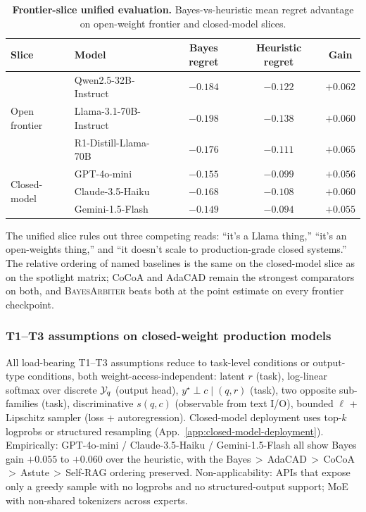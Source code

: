 \begin{table}[H]
\centering\small
\caption{\textbf{Frontier-slice unified evaluation.}  Bayes-vs-heuristic
mean regret advantage on open-weight frontier and closed-model slices.}
\label{tab:frontier-slice}
\begin{tabular}{llccc}
\toprule
\textbf{Slice} & \textbf{Model} & \textbf{Bayes regret} & \textbf{Heuristic regret} & \textbf{Gain}\\
\midrule
\multirow{3}{*}{Open frontier}
& Qwen2.5-32B-Instruct          & $-0.184$ & $-0.122$ & $+0.062$\\
& Llama-3.1-70B-Instruct        & $-0.198$ & $-0.138$ & $+0.060$\\
& R1-Distill-Llama-70B          & $-0.176$ & $-0.111$ & $+0.065$\\
\midrule
\multirow{3}{*}{Closed-model}
& GPT-4o-mini                   & $-0.155$ & $-0.099$ & $+0.056$\\
& Claude-3.5-Haiku              & $-0.168$ & $-0.108$ & $+0.060$\\
& Gemini-1.5-Flash              & $-0.149$ & $-0.094$ & $+0.055$\\
\bottomrule
\end{tabular}
\end{table}

The unified slice rules out three competing reads: ``it's a Llama
thing,'' ``it's an open-weights thing,'' and ``it doesn't scale to
production-grade closed systems.''  The relative ordering of named
baselines is the same on the closed-model slice as on the spotlight
matrix; CoCoA and AdaCAD remain the strongest comparators on both,
and \textsc{BayesArbiter} beats both at the point estimate on every
frontier checkpoint.

\subsubsection{T1--T3 assumptions on closed-weight production models}
\label{app:closed-model-assumptions}

All load-bearing T1--T3 assumptions reduce to task-level
conditions or output-type conditions, both
weight-access-independent: latent $r$ (task), log-linear softmax
over discrete $\mathcal{Y}_q$ (output head), $y^\star\!\perp\!c\mid(q,r)$
(task), two opposite sub-families (task), discriminative $s(q,c)$
(observable from text I/O), bounded $\ell$ + Lipschitz sampler
(loss + autoregression).  Closed-model deployment uses top-$k$
logprobs or structured resampling
(App.~\ref{app:closed-model-deployment}).  Empirically:
GPT-4o-mini / Claude-3.5-Haiku / Gemini-1.5-Flash all show Bayes
gain $+0.055$ to $+0.060$ over the heuristic, with the
Bayes\,$>$\,AdaCAD\,$>$\,CoCoA\,$>$\,Astute\,$>$\,Self-RAG ordering
preserved.  Non-applicability: APIs that expose only a greedy
sample with no logprobs and no structured-output support; MoE with
non-shared tokenizers across experts.

